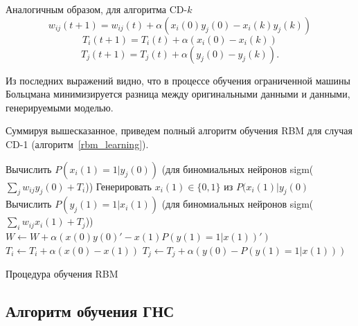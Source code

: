 Аналогичным образом, для алгоритма  CD-$k$
\begin{equation*}
	w_{ij}(t+1)=w_{ij}(t)+\alpha(x_i(0)y_j(0)-x_i(k)y_j(k))
\end{equation*} 
\begin{equation*}	
	T_i(t+1)=T_i(t)+\alpha(x_i(0)-x_i(k))
\end{equation*} 
\begin{equation*}		
	T_j(t+1)=T_j(t)+\alpha(y_j(0)-y_j(k)).
\end{equation*} 

Из последних выражений видно, что в процессе обучения ограниченной машины Больцмана минимизируется разница между оригинальными данными и данными, генерируемыми моделью.

Суммируя вышесказанное, приведем полный алгоритм обучения RBM для случая CD-1 (алгоритм~\ref{rbm_learning}).

\begin{algorithm}
	\SetAlgoLined
	
	{
		Вычислить $P(x_{i}(1)=1|y_j(0))$ (для биномиальных нейронов sigm($\sum_{j}{w_{ij}y_{j}(0)} + T_i$))\;
		Генерировать $x_{i}(1) \in \{0, 1\}$ из $P(x_{i}(1)|y_j(0)$\;
	}	
	{
		Вычислить $P(y_{j}(1)=1|x_i(1))$ (для биномиальных нейронов sigm($\sum_{i}{w_{ij}x_{i}(1)} + T_j$))\;
	}
	$W \leftarrow W + \alpha(x(0)y(0)' - x(1)P(y(1)=1|x(1))')$\;
	$T_i \leftarrow T_i + \alpha(x(0) - x(1))$\;
	$T_j \leftarrow T_j + \alpha(y(0) - P(y(1)=1|x(1)))$\;
	\caption{Процедура обучения RBM}
	\label{rbm_learning}
\end{algorithm}

\subsection{Алгоритм обучения ГНС} \label{subsect1_3_2}

